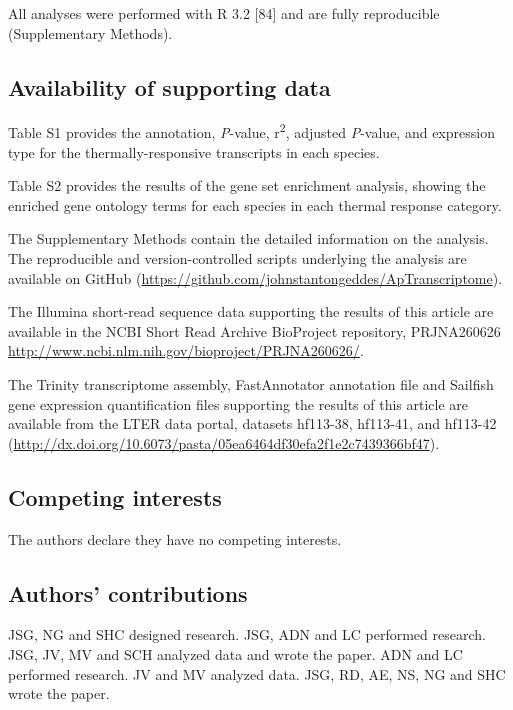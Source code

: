 \documentclass[]{article}
\begin{document}
All analyses were performed with R 3.2 {[}84{]} and are fully
reproducible (Supplementary Methods).

\subsection{Availability of supporting
data}\label{availability-of-supporting-data}

Table S1 provides the annotation, \emph{P}-value, r\textsuperscript{2},
adjusted \emph{P}-value, and expression type for the
thermally-responsive transcripts in each species.

Table S2 provides the results of the gene set enrichment analysis,
showing the enriched gene ontology terms for each species in each
thermal response category.

The Supplementary Methods contain the detailed information on the
analysis. The reproducible and version-controlled scripts underlying the
analysis are available on GitHub
(\url{https://github.com/johnstantongeddes/ApTranscriptome}).

The Illumina short-read sequence data supporting the results of this
article are available in the NCBI Short Read Archive BioProject
repository, PRJNA260626
\url{http://www.ncbi.nlm.nih.gov/bioproject/PRJNA260626/}.

The Trinity transcriptome assembly, FastAnnotator annotation file and
Sailfish gene expression quantification files supporting the results of
this article are available from the LTER data portal, datasets hf113-38,
hf113-41, and hf113-42
(\url{http://dx.doi.org/10.6073/pasta/05ea6464df30efa2f1e2c7439366bf47}).

\subsection{Competing interests}\label{competing-interests}

The authors declare they have no competing interests.

\subsection{Authors' contributions}\label{authors-contributions}

JSG, NG and SHC designed research. JSG, ADN and LC performed research.
JSG, JV, MV and SCH analyzed data and wrote the paper. ADN and LC
performed research. JV and MV analyzed data. JSG, RD, AE, NS, NG and SHC
wrote the paper.
\end{document}
